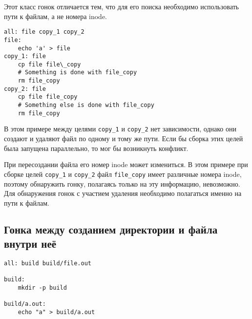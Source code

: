 Этот класс гонок отличается тем, что для его поиска необходимо использовать пути к файлам, а не номера inode.

\begin{lstlisting}
all: file copy_1 copy_2
file:
	echo 'a' > file
copy_1: file
	cp file file\_copy
	# Something is done with file_copy
	rm file_copy
copy_2: file
	cp file file_copy
	# Something else is done with file_copy
	rm file_copy
\end{lstlisting}

В этом примере между целями \texttt{copy\_1} и \texttt{copy\_2} нет зависимости, однако они создают и удаляют файл по одному и тому же пути. Если бы сборка этих целей была запущена параллельно, то мог бы возникнуть конфликт.

При пересоздании файла его номер inode может измениться. В этом примере при сборке целей \texttt{copy\_1} и \texttt{copy\_2} файл \texttt{file\_copy} имеет различные номера inode, поэтому обнаружить гонку, полагаясь только на эту информацию, невозможно. Для обнаружения гонок с участием удаления необходимо полагаться именно на пути к файлам.

\subsection{Гонка между созданием директории и файла внутри неё}

\begin{lstlisting}
all: build build/file.out

build:
    mkdir -p build

build/a.out:
    echo "a" > build/a.out

\end{lstlisting}
